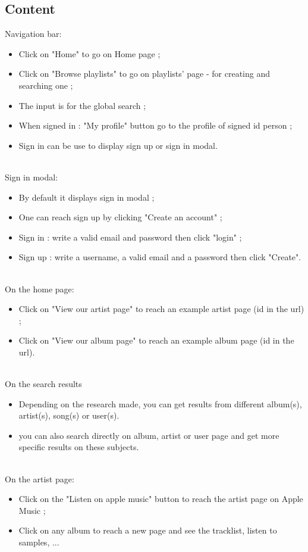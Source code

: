 \documentclass[11pt]{article}
\begin{document}
        \subsection{Content}
		\noindent
		Navigation bar:
		\begin{itemize}
		\item  Click on "Home" to go on Home page ;
		\item  Click on "Browse playlists" to go on playlists' page - for creating and searching one ;
		\item The input is for the global search ;
		\item When signed in : "My profile" button go to the profile of signed id person ;
		\item Sign in can be use to display sign up or sign in modal.
		\end{itemize}
		\noindent \\
		Sign in modal:
		\begin{itemize}
		\item By default it displays sign in modal ;
		\item One can reach sign up by clicking "Create an account" ;
		\item Sign in : write a valid email and password then click "login"  ;
		\item Sign up : write a username, a valid email and a password then click "Create".
		\end{itemize}
		\noindent \\
		On the home page:
		\begin{itemize}
		\item Click on "View our artist page" to reach an example artist page (id in the url) ;
		\item Click on "View our album page" to reach an example album page (id in the url).
		\end{itemize}
		\noindent \\
		On the search results
		\begin{itemize}
		\item Depending on the research made, you can get results from different album(s), artist(s), song(s) or user(s).
		\item you can also search directly on album, artist or user page and get more specific results on these subjects.
		\end{itemize}
		\noindent \\
		On the artist page:
		\begin{itemize}
		\item Click on the "Listen on apple music" button to reach the artist page on Apple Music ;
        \item Click on any album to reach a new page and see the tracklist, listen to samples, ...
        \end{itemize}
\end{document}
